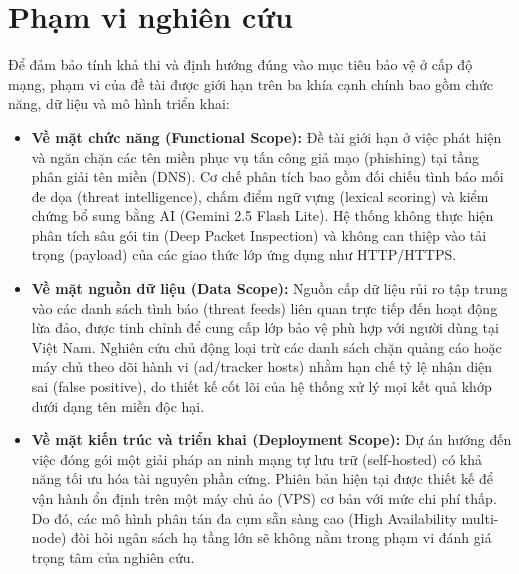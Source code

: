 \section{Phạm vi nghiên cứu}

Để đảm bảo tính khả thi và định hướng đúng vào mục tiêu bảo vệ ở cấp độ mạng, phạm vi của đề tài được giới hạn trên ba khía cạnh chính bao gồm chức năng, dữ liệu và mô hình triển khai:

\begin{itemize}
    \item \textbf{Về mặt chức năng (Functional Scope):} Đề tài giới hạn ở việc phát hiện và ngăn chặn các tên miền phục vụ tấn công giả mạo (phishing) tại tầng phân giải tên miền (DNS). Cơ chế phân tích bao gồm đối chiếu tình báo mối đe dọa (threat intelligence), chấm điểm ngữ vựng (lexical scoring) và kiểm chứng bổ sung bằng AI (Gemini 2.5 Flash Lite). Hệ thống không thực hiện phân tích sâu gói tin (Deep Packet Inspection) và không can thiệp vào tải trọng (payload) của các giao thức lớp ứng dụng như HTTP/HTTPS.
    
    \item \textbf{Về mặt nguồn dữ liệu (Data Scope):} Nguồn cấp dữ liệu rủi ro tập trung vào các danh sách tình báo (threat feeds) liên quan trực tiếp đến hoạt động lừa đảo, được tinh chỉnh để cung cấp lớp bảo vệ phù hợp với người dùng tại Việt Nam. Nghiên cứu chủ động loại trừ các danh sách chặn quảng cáo hoặc máy chủ theo dõi hành vi (ad/tracker hosts) nhằm hạn chế tỷ lệ nhận diện sai (false positive), do thiết kế cốt lõi của hệ thống xử lý mọi kết quả khớp dưới dạng tên miền độc hại.
    
    \item \textbf{Về mặt kiến trúc và triển khai (Deployment Scope):} Dự án hướng đến việc đóng gói một giải pháp an ninh mạng tự lưu trữ (self-hosted) có khả năng tối ưu hóa tài nguyên phần cứng. Phiên bản hiện tại được thiết kế để vận hành ổn định trên một máy chủ ảo (VPS) cơ bản với mức chi phí thấp. Do đó, các mô hình phân tán đa cụm sẵn sàng cao (High Availability multi-node) đòi hỏi ngân sách hạ tầng lớn sẽ không nằm trong phạm vi đánh giá trọng tâm của nghiên cứu.
\end{itemize}

